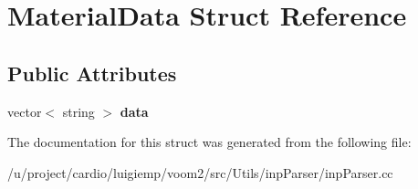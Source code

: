 \hypertarget{struct_material_data}{
\section{MaterialData Struct Reference}
\label{struct_material_data}
}
\subsection*{Public Attributes}
\begin{DoxyCompactItemize}
\item 
\hypertarget{struct_material_data_ac8d0f8f8b55e2d4280770bcdfc6ee307}{
vector$<$ string $>$ {\bfseries data}}
\label{struct_material_data_ac8d0f8f8b55e2d4280770bcdfc6ee307}

\end{DoxyCompactItemize}


The documentation for this struct was generated from the following file:\begin{DoxyCompactItemize}
\item 
/u/project/cardio/luigiemp/voom2/src/Utils/inpParser/inpParser.cc\end{DoxyCompactItemize}
